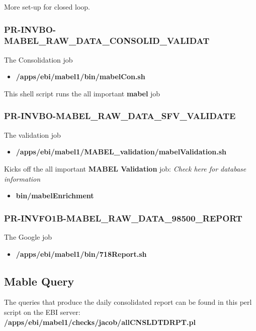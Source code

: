 \documentclass[12pt,twoside]{article}
\begin{document}
More set-up for closed loop.
\subsubsection{PR-INVBO-MABEL\_RAW\_DATA\_CONSOLID\_VALIDAT}
\label{sec:orgheadline50}
The Consolidation job
\begin{itemize}
\item \textbf{/apps/ebi/mabel1/bin/mabelCon.sh}
\end{itemize}

This shell script runs the all important \textbf{mabel} job
\subsubsection{PR-INVBO-MABEL\_RAW\_DATA\_SFV\_VALIDATE}
\label{sec:orgheadline51}
The validation job 
\begin{itemize}
\item \textbf{/apps/ebi/mabel1/MABEL\_validation/mabelValidation.sh}
\end{itemize}

Kicks off the all important \textbf{MABEL Validation} job: \emph{Check here for database information}
\begin{itemize}
\item \textbf{bin/mabelEnrichment}
\end{itemize}
\subsubsection{PR-INVFO1B-MABEL\_RAW\_DATA\_98500\_REPORT}
\label{sec:orgheadline52}
The Google job
\begin{itemize}
\item \textbf{/apps/ebi/mabel1/bin/718Report.sh}
\end{itemize}
\normalsize
\subsection{Mable Query}
\label{sec:orgheadline55}
The queries that produce the daily consolidated report 
can be found in this perl script on the 
EBI server: \textbf{/apps/ebi/mabel1/checks/jacob/allCNSLDTDRPT.pl}
\end{document}

